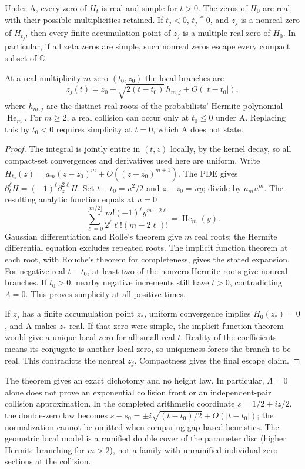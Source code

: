 \begin{theorem}
Under A, every zero of $H_t$ is real and simple for $t>0$.
The zeros of $H_0$ are real, with their possible multiplicities retained.
If $t_j<0$, $t_j\uparrow0$, and $z_j$ is a nonreal zero of $H_{t_j}$,
then every finite accumulation point of $z_j$ is a multiple real zero
of $H_0$. In particular, if all zeta zeros are simple, such nonreal zeros
escape every compact subset of $\mathbb C$.

At a real multiplicity-$m$ zero $(t_0,z_0)$ the local branches are
\[
 z_j(t)=z_0+\sqrt{2(t-t_0)}\,h_{m,j}+O(|t-t_0|),
\]
where $h_{m,j}$ are the distinct real roots of the probabilists' Hermite
polynomial $\operatorname{He}_m$. For $m\ge2$, a real collision can occur only
at $t_0\le0$ under A. Replacing this by $t_0<0$ requires simplicity at
$t=0$, which A does not state.
\end{theorem}
\begin{proof}
The integral is jointly entire in $(t,z)$ locally, by the kernel decay,
so all compact-set convergences and derivatives used here are uniform.
Write $H_{t_0}(z)=a_m(z-z_0)^m+O((z-z_0)^{m+1})$.
The PDE gives
$\partial_t^\ell H=(-1)^\ell\partial_z^{2\ell}H$.
Set $t-t_0=u^2/2$ and $z-z_0=uy$; divide by $a_mu^m$.
The resulting analytic function equals at $u=0$
\[
 \sum_{\ell=0}^{\lfloor m/2\rfloor}
 \frac{m!(-1)^\ell y^{m-2\ell}}
 {2^\ell\ell!(m-2\ell)!}=\operatorname{He}_m(y).
\]
Gaussian differentiation and Rolle's theorem give $m$ real roots;
the Hermite differential equation excludes repeated roots. The implicit
function theorem at each root, with Rouche's theorem for completeness,
gives the stated expansion. For negative real $t-t_0$, at least two
of the nonzero Hermite roots give nonreal branches. If $t_0>0$, nearby
negative increments still have $t>0$, contradicting $\Lambda=0$.
This proves simplicity at all positive times.

If $z_j$ has a finite accumulation point $z_*$, uniform convergence
implies $H_0(z_*)=0$, and A makes $z_*$ real. If that zero were simple,
the implicit function theorem would give a unique local zero for all
small real $t$. Reality of the coefficients means its conjugate is
another local zero, so uniqueness forces the branch to be real. This
contradicts the nonreal $z_j$. Compactness gives the final escape claim.
\end{proof}

The theorem gives an exact dichotomy and no height law. In particular,
$\Lambda=0$ alone does not prove an exponential collision front or an
independent-pair collision approximation. In the completed arithmetic
coordinate $s=1/2+iz/2$, the double-zero law becomes
$s-s_0=\pm i\sqrt{(t-t_0)/2}+O(|t-t_0|)$; the normalization cannot
be omitted when comparing gap-based heuristics. The geometric local
model is a ramified double cover of the parameter disc (higher
Hermite branching for $m>2$), not a family with unramified individual
zero sections at the collision.

